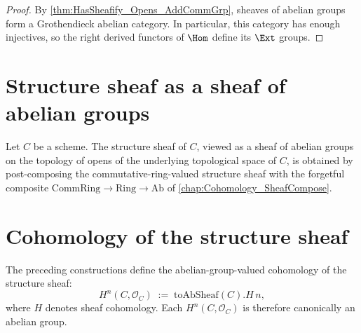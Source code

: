 \begin{proof}


\leanok
  By \cref{thm:HasSheafify_Opens_AddCommGrp}, sheaves of abelian groups form a Grothendieck abelian category. In particular, this category has enough injectives, so the right derived functors of \(\Hom\) define its \(\Ext\) groups.
\end{proof}

\section{Structure sheaf as a sheaf of abelian groups}

\begin{definition}\leanok
  \label{def:Scheme_toAbSheaf}

  Let \(C\) be a scheme. The structure sheaf of \(C\), viewed as a sheaf of abelian groups on the topology of opens of the underlying topological space of \(C\), is obtained by post-composing the commutative-ring-valued structure sheaf with the forgetful composite \(\mathrm{CommRing} \to \mathrm{Ring} \to \mathrm{Ab}\) of \cref{chap:Cohomology_SheafCompose}.
\end{definition}

\section{Cohomology of the structure sheaf}

The preceding constructions define the abelian-group-valued cohomology of the structure sheaf:
\[
  H^n(C, \mathcal O_C) \;:=\; \text{toAbSheaf}(C).H\,n,
\]
where \(H\) denotes sheaf cohomology. Each \(H^n(C, \mathcal O_C)\) is therefore canonically an abelian group.
